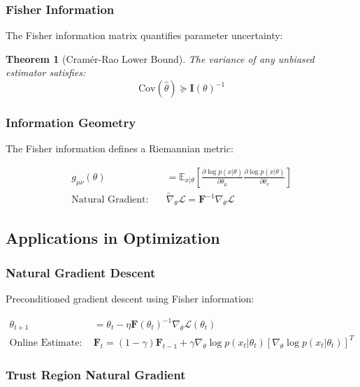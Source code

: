 \documentclass[11pt,letterpaper,openany]{book}
\newtheorem{theorem}{Theorem}[chapter]
\newcommand{\Cov}{\mathrm{Cov}}
\begin{document}
\subsubsection{Fisher Information}

The Fisher information matrix quantifies parameter uncertainty:

\begin{theorem}[Cramér-Rao Lower Bound]
The variance of any unbiased estimator satisfies:
\[
\Cov(\hat{\theta}) \succeq \mathbf{I}(\theta)^{-1}
\]
\end{theorem}

\subsubsection{Information Geometry}

The Fisher information defines a Riemannian metric:

\begin{align}
g_{\mu\nu}(\theta) &= \mathbb{E}_{x|\theta} \left[ \frac{\partial \log p(x|\theta)}{\partial \theta_\mu} \frac{\partial \log p(x|\theta)}{\partial \theta_\nu} \right] \\
\text{Natural Gradient:} \quad & \tilde{\nabla}_\theta \mathcal{L} = \mathbf{F}^{-1} \nabla_\theta \mathcal{L}
\end{align}

\subsection{Applications in Optimization}

\subsubsection{Natural Gradient Descent}

Preconditioned gradient descent using Fisher information:

\begin{align}
\theta_{t+1} &= \theta_t - \eta \mathbf{F}(\theta_t)^{-1} \nabla_\theta \mathcal{L}(\theta_t) \\
\text{Online Estimate:} \quad & \mathbf{F}_t = (1 - \gamma) \mathbf{F}_{t-1} + \gamma \nabla_\theta \log p(x_t|\theta_t) [\nabla_\theta \log p(x_t|\theta_t)]^T
\end{align}

\subsubsection{Trust Region Natural Gradient}
\end{document}
